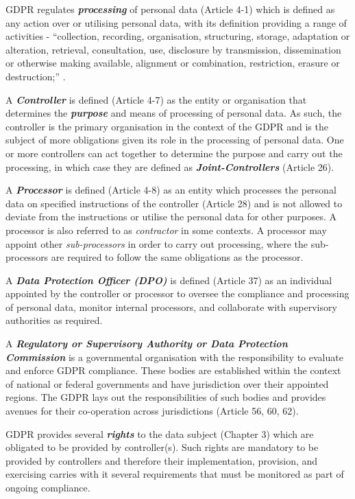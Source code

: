 GDPR regulates \textit{\textbf{processing}} of personal data (Article 4-1) which is defined as any action over or utilising personal data, with its definition providing a range of activities - ``collection, recording, organisation, structuring, storage, adaptation or alteration, retrieval, consultation, use, disclosure by transmission, dissemination or otherwise making available, alignment or combination, restriction, erasure or destruction;'' \cite{Regulation_GDPR}.

A \textit{\textbf{Controller}} is defined (Article 4-7) as the entity or organisation that determines the \textit{\textbf{purpose}} and means of processing of personal data. As such, the controller is the primary organisation in the context of the GDPR and is the subject of more obligations given its role in the processing of personal data. One or more controllers can act together to determine the purpose and carry out the processing, in which case they are defined as \textit{\textbf{Joint-Controllers}} (Article 26).

A \textit{\textbf{Processor}} is defined (Article 4-8) as an entity which processes the personal data on specified instructions of the controller (Article 28) and is not allowed to deviate from the instructions or utilise the personal data for other purposes. A processor is also referred to as \textit{contractor} in some contexts. A processor may appoint other \textit{sub-processors} in order to carry out processing, where the sub-processors are required to follow the same obligations as the processor.

A \textit{\textbf{Data Protection Officer (DPO)}} is defined (Article 37) as an individual appointed by the controller or processor to oversee the compliance and processing of personal data, monitor internal processors, and collaborate with supervisory authorities as required.

A \textit{\textbf{Regulatory or Supervisory Authority or Data Protection Commission}} is a governmental organisation with the responsibility to evaluate and enforce GDPR compliance. These bodies are established within the context of national or federal governments and have jurisdiction over their appointed regions. The GDPR lays out the responsibilities of such bodies and provides avenues for their co-operation across jurisdictions (Article 56, 60, 62).

GDPR provides several \textbf{\textit{rights}} to the data subject (Chapter 3) which are obligated to be provided by controller(s). Such rights are mandatory to be provided by controllers and therefore their implementation, provision, and exercising carries with it several requirements that must be monitored as part of ongoing compliance.

